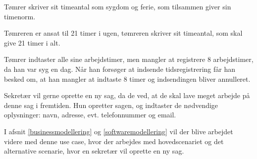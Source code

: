 Tømrer skriver sit timeantal som sygdom og ferie, som tilsammen giver sin timenorm.

Tømreren er ansat til 21 timer i ugen, tømreren skriver sit timeantal, som skal give 21 timer i alt.

Tømrer indtaster alle sine arbejdstimer, men mangler at registrere 8 arbejdstimer, da han var syg en dag.
Når han forsøger at indsende tidsregistrering får han besked om, at han mangler at indtaste 8 timer og indsendingen bliver annulleret.

Sekretær vil gerne oprette en ny sag, da de ved, at de skal lave meget arbejde på denne sag i fremtiden.
Hun opretter sagen, og indtaster de nødvendige oplysninger: navn, adresse, evt. telefonnummer og email.

I afsnit \ref{businessmodellering} og \ref{softwaremodellering} vil der blive arbejdet videre med denne use case, hvor der arbejdes med hovedscenariet og det alternative scenarie, hvor en sekretær vil oprette en ny sag.


